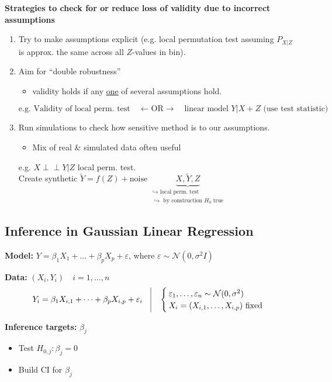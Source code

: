 \textbf{Strategies to check for or reduce loss of validity due to incorrect assumptions}
\begin{enumerate}
    \item Try to make assumptions explicit (e.g. local permutation test assuming $P_{X|Z}$ is approx. the same across all $Z$-values in bin).
    \item Aim for ``double robustness''
    \begin{itemize}
        \item[$\hookrightarrow$] validity holds if any \underline{one} of several assumptions hold.
    \end{itemize}
    \[
    \text{e.g. } \text{Validity of local perm. test} \quad \longleftarrow \text{OR} \longrightarrow \quad \text{linear model } Y|X+Z \text{ (use test statistic)}
    \]
    \item Run simulations to check how sensitive method is to our assumptions.
    \begin{itemize}
        \item[$\hookrightarrow$] Mix of real \& simulated data often useful
    \end{itemize}
    e.g. $X \perp \!\! \perp Y | Z$ local perm. test.\\
    Create synthetic $\tilde{Y} = f(Z) + \text{noise}$
    $
    \underbrace{X, \tilde{Y}, Z}_{\substack{\hookrightarrow \text{ local perm. test} \\ \hookrightarrow \text{ by construction } H_0 \text{ true}}}
    $
\end{enumerate}


\subsection{Inference in Gaussian Linear Regression}

\textbf{Model:} $Y = \beta_1 X_1 + \dots + \beta_p X_p + \varepsilon$, where $\varepsilon \sim \mathcal{N}(0, \sigma^2 I)$

\textbf{Data:} $(X_i, Y_i) \quad i=1, \dots, n$
\[
Y_i = \beta_1 X_{i,1} + \dots + \beta_p X_{i,p} + \varepsilon_i \quad \vline \quad \begin{cases} \varepsilon_1, \dots, \varepsilon_n \sim \mathcal{N}(0, \sigma^2) \\ X_i = (X_{i,1}, \dots, X_{i,p}) \text{ fixed} \end{cases}
\]

\textbf{Inference targets:} $\beta_j$
\begin{itemize}
    \item Test $H_{0,j} : \beta_j = 0$
    \item Build CI for $\beta_j$
\end{itemize}

